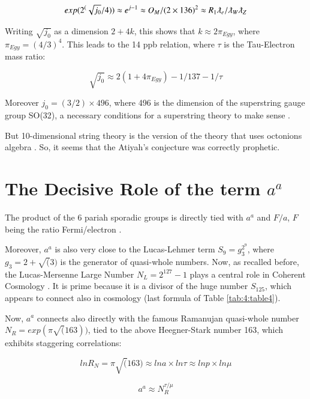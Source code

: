 \documentclass[a4paper,9pt]{article}
\begin{document}
 \begin{equation}
 exp(2^(\sqrt{j_0}/4)) \approx e^{j -1} \approx O_M/(2\times 136)^2 \approx R_1 \lambdabar_e / \lambdabar_W \lambdabar_Z
\end{equation}

Writing $\sqrt{j_0}$ as a dimension $2+4k$, this shows that $k \approx 2 \pi_{Egy}$, where $\pi_{Egy} = (4/3)^4$. This leads to the 14 ppb relation, where $\tau$ is the Tau-Electron mass ratio: 

\begin{equation}
 \sqrt{j_0} \approx 2 (1+4\pi_{Egy}) - 1/137 -1/\tau
\end{equation}
 

Moreover $j_0 = (3/2) \times 496$, where 496 is the dimension of the superstring gauge group SO(32), a necessary conditions for a superstring theory to make sense \cite{Green}.


But 10-dimensional string theory is the version of the theory that uses octonions algebra \cite{Schlay}. So, it seems that the Atiyah's conjecture was correctly prophetic.

\section{The Decisive Role of the term $a^a$ }

The product of the 6 pariah sporadic groups is directly tied with $a^a$ and $F/a$, $F$ being the ratio Fermi/electron \cite{Sanchez}. 

Moreover, $a^a$  is also very close to the Lucas-Lehmer term $S_9 = g_3^{2^9}$, where $ g_3 = 2 + \sqrt(3)$ is the generator of quasi-whole numbers. Now, as recalled before, the Lucas-Mersenne Large Number $N_L = 2^{127} - 1$ plays a central role in Coherent Cosmology \cite{Sanchez}. It is prime because it is a divisor of the huge number $S_{125}$, which appears to connect also in cosmology (last formula of Table \ref{tab:4:table4}).


Now, $a^a$ connects also directly with the famous Ramanujan quasi-whole number $N_R = exp(\pi \sqrt(163))$, tied to the above Heegner-Stark number 163, which exhibits staggering correlations:



\begin{equation}
lnR_N = \pi \sqrt(163)  \approx lna \times ln\tau  \approx  lnp \times ln\mu
\end{equation}

\begin{equation}
a^a \approx N_R^{\tau/\mu} 
\end{equation}
\end{document}
